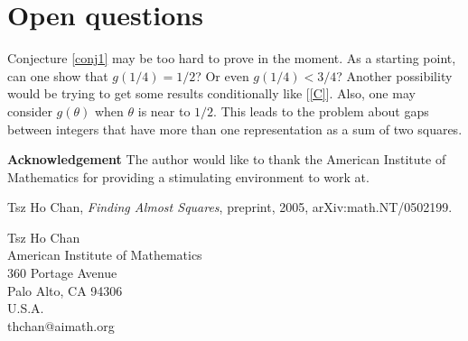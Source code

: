 \documentclass{article}
\begin{document}
\section{Open questions}
Conjecture \ref{conj1} may be too hard to prove in the moment. As a starting point, can one show that $g(1/4) = 1/2$? Or even $g(1/4) < 3/4$? Another possibility would be trying to get some results conditionally like [\ref{C}]. Also, one may consider $g(\theta)$ when $\theta$ is near to $1/2$. This leads to the problem about gaps between integers that have more than one representation as a sum of two squares.

\bigskip

{\bf Acknowledgement} The author would like to thank the American Institute of Mathematics for providing a stimulating environment to work at.
\begin{thebibliography}{9}
\item\label{C} Tsz Ho Chan, {\em Finding Almost Squares}, preprint, 2005, arXiv:math.NT/0502199.
\end{thebibliography}
Tsz Ho Chan\\
American Institute of Mathematics\\
360 Portage Avenue\\
Palo Alto, CA 94306\\
U.S.A.\\
thchan@aimath.org
\end{document}
